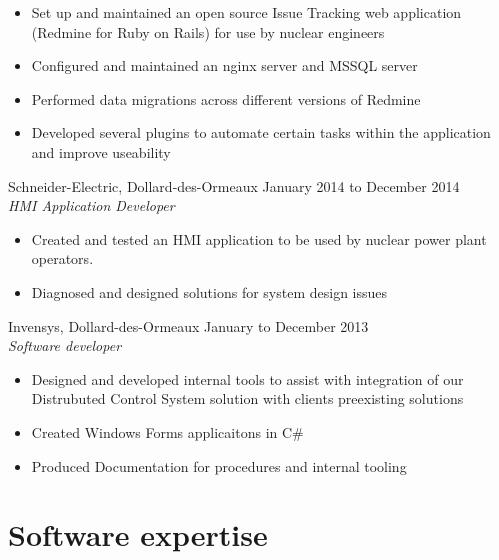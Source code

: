 \documentclass{res}
\newcommand{\inFrench}[1]{}
\newcommand{\inEnglish}[1]{#1}
\begin{document}
\begin{resume}
{	\begin{itemize} \itemsep -2pt
		\item Set up and maintained an open source Issue Tracking web application (Redmine for Ruby on Rails) for use by nuclear engineers
		\item Configured and maintained an nginx server and MSSQL server
		\item Performed data migrations across different versions of Redmine
		\item Developed several plugins to automate certain tasks within the application and improve useability
	\end{itemize}

	Schneider-Electric, Dollard-des-Ormeaux
	\hfill January 2014 to December 2014 \\
	{\sl HMI Application Developer}
	\vspace{0.05in}

	\begin{itemize} \itemsep -2pt
		\item Created and tested an HMI application to be used by nuclear power plant operators.
		\item Diagnosed and designed solutions for system design issues
	\end{itemize}

	Invensys, Dollard-des-Ormeaux
	\hfill January to December 2013 \\
	{\sl Software developer}
	\vspace{0.05in}

	\begin{itemize} \itemsep -2pt
		\item Designed and developed internal tools to assist with integration of our Distrubuted Control System solution with clients preexisting solutions
		\item Created Windows Forms applicaitons in C\#
		\item Produced Documentation for procedures and internal tooling
	\end{itemize}
}

\inFrench{
	\section{Connaissances informatiques}
}
\inEnglish{
	\section{Software expertise}
}
\vspace{6pt}


\end{resume}
\end{document}
